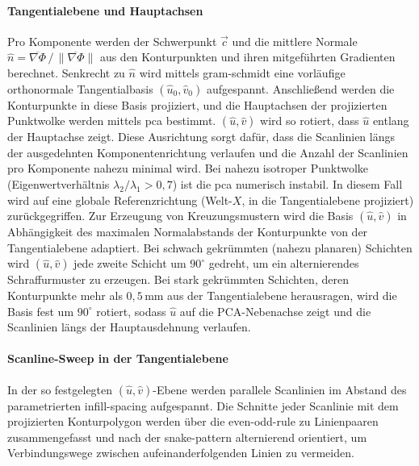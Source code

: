                 \paragraph{Tangentialebene und Hauptachsen}
                    Pro Komponente werden der Schwerpunkt $\vec{c}$ und die mittlere Normale $\hat{n} = \overline{\nabla\Phi}\,/\,\lVert\overline{\nabla\Phi}\rVert$ aus den Konturpunkten und ihren mitgeführten Gradienten berechnet.
                    Senkrecht zu $\hat{n}$ wird mittels \gls{gram-schmidt} eine vorläufige orthonormale Tangentialbasis $(\hat{u}_0, \hat{v}_0)$ aufgespannt.
                    Anschließend werden die Konturpunkte in diese Basis projiziert, und die Hauptachsen der projizierten Punktwolke werden mittels \gls{pca} bestimmt.
                    $(\hat{u}, \hat{v})$ wird so rotiert, dass $\hat{u}$ entlang der Hauptachse zeigt.
                    Diese Ausrichtung sorgt dafür, dass die Scanlinien längs der ausgedehnten Komponentenrichtung verlaufen und die Anzahl der Scanlinien pro Komponente nahezu minimal wird.
                    Bei nahezu isotroper Punktwolke (Eigenwertverhältnis $\lambda_2/\lambda_1 > 0{,}7$) ist die \gls{pca} numerisch instabil.
                    In diesem Fall wird auf eine globale Referenzrichtung (Welt-$X$, in die Tangentialebene projiziert) zurückgegriffen.
                    Zur Erzeugung von Kreuzungsmustern wird die Basis $(\hat{u}, \hat{v})$ in Abhängigkeit des maximalen Normalabstands der Konturpunkte von der Tangentialebene adaptiert.
                    Bei schwach gekrümmten (nahezu planaren) Schichten wird $(\hat{u}, \hat{v})$ jede zweite Schicht um $90^\circ$ gedreht, um ein alternierendes Schraffurmuster zu erzeugen.
                    Bei stark gekrümmten Schichten, deren Konturpunkte mehr als $0{,}5\,\text{mm}$ aus der Tangentialebene herausragen, wird die Basis fest um $90^\circ$ rotiert, sodass $\hat{u}$ auf die PCA-Nebenachse zeigt und die Scanlinien längs der Hauptausdehnung verlaufen.

                \paragraph{Scanline-Sweep in der Tangentialebene}
                    In der so festgelegten $(\hat{u},\hat{v})$-Ebene werden parallele Scanlinien im Abstand des parametrierten \gls{infill-spacing} aufgespannt.
                    Die Schnitte jeder Scanlinie mit dem projizierten Konturpolygon werden über die \gls{even-odd-rule} zu Linienpaaren zusammengefasst und nach der \gls{snake-pattern} alternierend orientiert, um Verbindungswege zwischen aufeinanderfolgenden Linien zu vermeiden.

